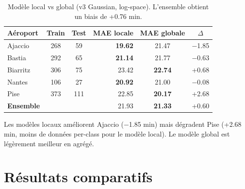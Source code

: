 \documentclass[11pt,a4paper]{article}
\begin{document}
\begin{table}[H]
\centering
\small
\begin{tabular}{@{}lccrcc@{}}
\toprule
\textbf{Aéroport} & \textbf{Train} & \textbf{Test} & \textbf{MAE locale} & \textbf{MAE globale} & $\Delta$ \\
\midrule
Ajaccio  & 268 & 59  & \textbf{19.62} & 21.47 & $-$1.85 \\
Bastia   & 292 & 65  & \textbf{21.14} & 21.77 & $-$0.63 \\
Biarritz & 306 & 75  & 23.42 & \textbf{22.74} & +0.68 \\
Nantes   & 106 & 27  & \textbf{20.92} & 21.00 & $-$0.08 \\
Pise     & 373 & 111 & 22.85 & \textbf{20.17} & +2.68 \\
\midrule
\textbf{Ensemble} & & & 21.93 & \textbf{21.33} & +0.60 \\
\bottomrule
\end{tabular}
\caption{Modèle local vs global (v3 Gaussian, log-space). L'ensemble obtient un biais de +0.76 min.}
\end{table}

Les modèles locaux améliorent Ajaccio ($-$1.85 min) mais dégradent Pise (+2.68 min, moins de données per-class pour le modèle local). Le modèle global est légèrement meilleur en agrégé.


\section{Résultats comparatifs}
\end{document}
